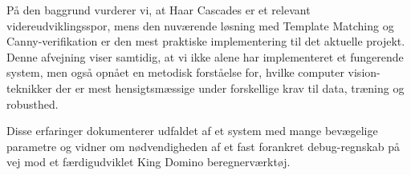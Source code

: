 På den baggrund vurderer vi, at Haar Cascades er et relevant videreudviklingsspor, mens den nuværende løsning med Template Matching og Canny-verifikation er den mest praktiske implementering til det aktuelle projekt. Denne afvejning viser samtidig, at vi ikke alene har implementeret et fungerende system, men også opnået en metodisk forståelse for, hvilke computer vision-teknikker der er mest hensigtsmæssige under forskellige krav til data, træning og robusthed.

Disse erfaringer dokumenterer udfaldet af et system med mange bevægelige parametre og vidner om nødvendigheden af et fast forankret debug-regnskab på vej mod et færdigudviklet King Domino beregnerværktøj.
